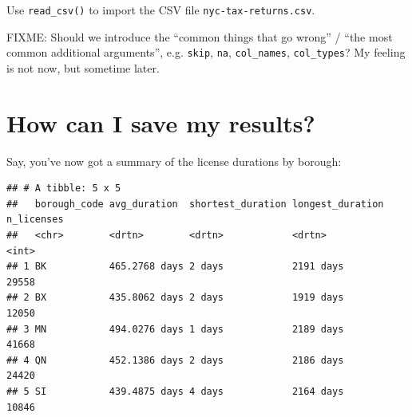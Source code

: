 \documentclass[]{Nemilov}
\newenvironment{Shaded}{\begin{snugshade}}{\end{snugshade}}
\newcommand{\DataTypeTok}[1]{\textcolor[rgb]{0.13,0.29,0.53}{#1}}
\newcommand{\DecValTok}[1]{\textcolor[rgb]{0.00,0.00,0.81}{#1}}
\newcommand{\KeywordTok}[1]{\textcolor[rgb]{0.13,0.29,0.53}{\textbf{#1}}}
\newcommand{\NormalTok}[1]{#1}
\newcommand{\OperatorTok}[1]{\textcolor[rgb]{0.81,0.36,0.00}{\textbf{#1}}}
\newcommand{\StringTok}[1]{\textcolor[rgb]{0.31,0.60,0.02}{#1}}
\begin{document}
Use \texttt{read\_csv()} to import the CSV file \texttt{nyc-tax-returns.csv}.

FIXME: Should we introduce the ``common things that go wrong'' / ``the most common additional arguments'', e.g. \texttt{skip}, \texttt{na}, \texttt{col\_names}, \texttt{col\_types}? My feeling is not now, but sometime later.

\hypertarget{how-can-i-save-my-results}{%
\section{How can I save my results?}\label{how-can-i-save-my-results}}

Say, you've now got a summary of the license durations by borough:

\begin{Shaded}
\end{Shaded}

\begin{verbatim}
## # A tibble: 5 x 5
##   borough_code avg_duration  shortest_duration longest_duration n_licenses
##   <chr>        <drtn>        <drtn>            <drtn>                <int>
## 1 BK           465.2768 days 2 days            2191 days             29558
## 2 BX           435.8062 days 2 days            1919 days             12050
## 3 MN           494.0276 days 1 days            2189 days             41668
## 4 QN           452.1386 days 2 days            2186 days             24420
## 5 SI           439.4875 days 4 days            2164 days             10846
\end{verbatim}
\end{document}
